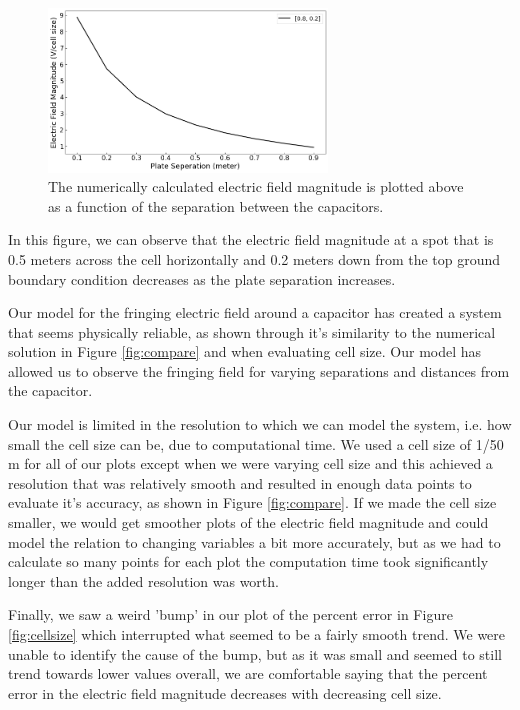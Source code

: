 \documentclass{report}
\begin{document}
            \begin{figure}[h]
                \centering
                \includegraphics[width=0.66\textwidth]{images/FringeChangingSep.png}
                \caption{The numerically calculated electric field magnitude is plotted above as a function of the separation between the capacitors.}
                \label{fig:sep}
            \end{figure}
            
            In this figure, we can observe that the electric field magnitude at a spot that is 0.5 meters across the cell horizontally and 0.2 meters down from the top ground boundary condition decreases as the plate separation increases.
        
            Our model for the fringing electric field around a capacitor has created a system that seems physically reliable, as shown through it's similarity to the numerical solution in Figure \ref{fig:compare} and when evaluating cell size. Our model has allowed us to observe the fringing field for varying separations and distances from the capacitor. 
            
            Our model is limited in the resolution to which we can model the system, i.e. how small the cell size can be, due to computational time. We used a cell size of 1/50 m for all of our plots except when we were varying cell size and this achieved a resolution that was relatively smooth and resulted in enough data points to evaluate it's accuracy, as shown in Figure \ref{fig:compare}. If we made the cell size smaller, we would get smoother plots of the electric field magnitude and could model the relation to changing variables a bit more accurately, but as we had to calculate so many points for each plot the computation time took significantly longer than the added resolution was worth.
            
            Finally, we saw a weird 'bump' in our plot of the percent error in Figure \ref{fig:cellsize} which interrupted what seemed to be a fairly smooth trend. We were unable to identify the cause of the bump, but as it was small and seemed to still trend towards lower values overall, we are comfortable saying that the percent error in the electric field magnitude decreases with decreasing cell size.
\end{document}
